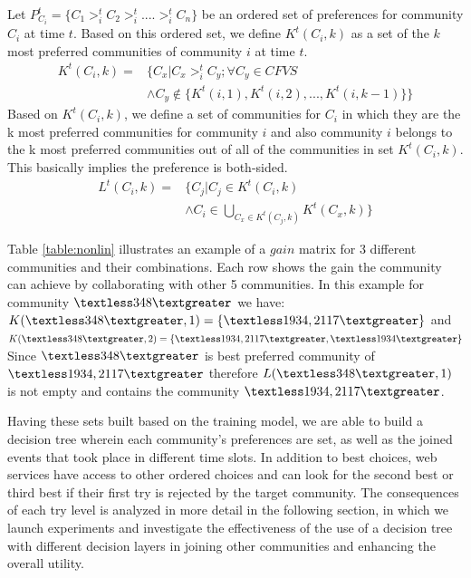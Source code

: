 \documentclass[10pt,journal,cspaper,compsoc]{IEEEtran}
\begin{document}
Let $P_{C_i}^t = \{C_1 >_{i}^t C_2 >_{i}^t .... >_{i}^t C_n\}$ be an ordered set of preferences for community $C_i$ at time $t$. Based on this ordered set, we define $K^t(C_i, k)$ as a set of the $k$ most preferred communities of community $i$ at time $t$.
\begin{equation}\label{h_t_pref_top}
\begin{split}				
K^t(C_i, k) = &\Big\{C_x | C_x >_{i}^t C_y; \forall C_y \in CFVS\ \\
				      &\wedge C_y \notin \{K^t(i, 1),K^t(i, 2),...,K^t(i, k-1)\} \Big\}				
\end{split}
\end{equation}
Based on $K^t(C_i, k)$, we define a set of communities for $C_i$ in which they are the k most preferred communities for community $i$ and also community $i$ belongs to the k most preferred communities out of all of the communities in set $K^t(C_i, k)$. This basically implies the preference is both-sided.
\begin{equation}\label{l_t_top_both}
\begin{split}	
L^t(C_i,k) = &\Big\{C_j | C_j \in K^t(C_i, k) \\
             &\wedge C_i \in \bigcup_{C_x \in K^t(C_j, k)}K^t(C_x, k)\Big\}
\end{split}
\end{equation}

Table \ref{table:nonlin} illustrates an example of a $gain$ matrix for 3 different communities and their combinations. Each row shows the gain the community can achieve by collaborating with other 5 communities. In this example for community $\textless 348 \textgreater$ we have: \\
$K(\textless 348 \textgreater, 1) = \{\textless1934, 2117\textgreater\}$ and \\
$K(\textless 348 \textgreater, 2) = \{\textless1934, 2117\textgreater, \textless1934\textgreater\}$ \\
Since $\textless 348 \textgreater$ is best preferred community of $\textless 1934, 2117 \textgreater$ therefore $L(\textless 348 \textgreater, 1)$ is not empty and contains the community $\textless1934, 2117\textgreater$.

Having these sets built based on the training model, we are able to build a decision tree wherein each community's preferences are set, as well as the joined events that took place in different time slots. In addition to best choices, web services have access to other ordered choices and can look for the second best or third best if their first try is rejected by the target community. The consequences of each try level is analyzed in more detail in the following section, in which we launch experiments and investigate the effectiveness of the use of a decision tree with different decision layers in joining other communities and enhancing the overall utility. 
\end{document}
